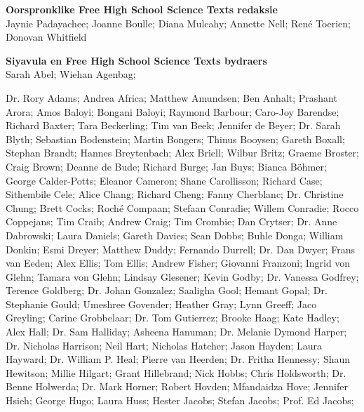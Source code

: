 \textbf{\large Oorspronklike Free High School Science Texts redaksie}\\

Jaynie Padayachee; Joanne Boulle; Diana Mulcahy; Annette Nell; René Toerien; Donovan Whitfield \par

\textbf{\large Siyavula en Free High School Science Texts bydraers}\\

    Sarah Abel;
Wiehan Agenbag;

Dr. Rory Adams;
    Andrea Africa;
    Matthew Amundsen;
    Ben Anhalt;
    Prashant Arora;
    Amos Baloyi;
    Bongani Baloyi;
    Raymond Barbour;
    Caro-Joy Barendse;
    Richard Baxter;
    Tara Beckerling;
    Tim van Beek;
    Jennifer de Beyer;
Dr. Sarah Blyth;
    Sebastian Bodenstein;
    Martin Bongers;
Thinus Booysen;
    Gareth Boxall;
    Stephan Brandt;
    Hannes Breytenbach;
    Alex Briell;
    Wilbur Britz;
    Graeme Broster;
    Craig Brown;
    Deanne de Bude;
    Richard Burge;
Jan Buys;
    Bianca Böhmer;
    George Calder-Potts;
    Eleanor Cameron;
Shane Carollisson;
    Richard Case;
    Sithembile Cele;
    Alice Chang;
    Richard Cheng;
    Fanny Cherblanc;
Dr. Christine Chung;
    Brett Cocks;
Roché Compaan;
    Stefaan Conradie;
Willem Conradie;
    Rocco Coppejans;
    Tim Craib;
    Andrew Craig;
    Tim Crombie;
    Dan Crytser;
Dr. Anne Dabrowski;
    Laura Daniels;
    Gareth Davies;
    Sean Dobbs;
    Buhle Donga;
    William Donkin;
    Esmi Dreyer;
    Matthew Duddy;
    Fernando Durrell;
Dr. Dan Dwyer;
    Frans van Eeden;
    Alex Ellis;
    Tom Ellis;
    Andrew Fisher;
    Giovanni Franzoni;
    Ingrid von Glehn;
    Tamara von Glehn;
    Lindsay Glesener;
    Kevin Godby;
Dr. Vanessa Godfrey;
    Terence Goldberg;
Dr. Johan Gonzalez;
    Saaligha Gool;
    Hemant Gopal;
Dr. Stephanie Gould;
    Umeshree Govender;
    Heather Gray;
    Lynn Greeff;
Jaco Greyling;
    Carine Grobbelaar;
Dr. Tom Gutierrez;
    Brooke Haag;
    Kate Hadley;
    Alex Hall;
Dr. Sam Halliday;
    Asheena Hanuman;
Dr. Melanie Dymond Harper;
Dr. Nicholas Harrison;
    Neil Hart;
    Nicholas Hatcher;
    Jason Hayden;
    Laura Hayward;
Dr. William P. Heal;
    Pierre van Heerden;
Dr. Fritha Hennessy;
    Shaun Hewitson;
    Millie Hilgart;
    Grant Hillebrand;
    Nick Hobbs;
    Chris Holdsworth;
Dr. Benne Holwerda;
Dr. Mark Horner;
    Robert Hovden;
    Mfandaidza Hove;
    Jennifer Hsieh;
George Hugo;
    Laura Huss;
Hester Jacobs;
Stefan Jacobs;
Prof. Ed Jacobs;

